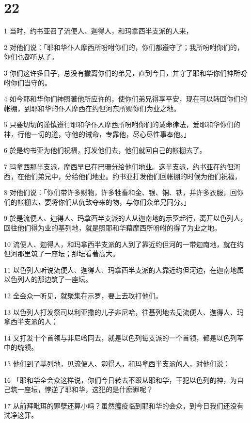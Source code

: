 \chapter{22}

\par 1 当时，约书亚召了流便人、迦得人，和玛拿西半支派的人来，
\par 2 对他们说：「耶和华仆人摩西所吩咐你们的，你们都遵守了；我所吩咐你们的，你们也都听从了。
\par 3 你们这许多日子，总没有撇离你们的弟兄，直到今日，并守了耶和华你们神所吩咐你们当守的。
\par 4 如今耶和华你们神照著他所应许的，使你们弟兄得享平安，现在可以转回你们的帐棚，到耶和华的仆人摩西在约但河东所赐你们为业之地。
\par 5 只要切切的谨慎遵行耶和华仆人摩西所吩咐你们的诫命律法，爱耶和华你们的神，行他一切的道，守他的诫命，专靠他，尽心尽性事奉他。」
\par 6 於是约书亚为他们祝福，打发他们去，他们就回自己的帐棚去了。
\par 7 玛拿西那半支派，摩西早已在巴珊分给他们地业。这半支派，约书亚在约但河西，在他们弟兄中，分给他们地业。约书亚打发他们回帐棚的时候为他们祝福，
\par 8 对他们说：「你们带许多财物，许多牲畜和金、银、铜、铁，并许多衣服，回你们的帐棚去，要将你们从仇敌夺来的物，与你们众弟兄同分。」
\par 9 於是流便人、迦得人、玛拿西半支派的人从迦南地的示罗起行，离开以色列人，回往他们得为业的基列地，就是照耶和华藉摩西所吩咐的得了为业之地。
\par 10 流便人、迦得人，和玛拿西半支派的人到了靠近约但河的一带迦南地，就在约但河那里筑了一座坛；那坛看著高大。
\par 11 以色列人听说流便人、迦得人、玛拿西半支派的人靠近约但河边，在迦南地属以色列人的那边筑了一座坛。
\par 12 全会众一听见，就聚集在示罗，要上去攻打他们。
\par 13 以色列人打发祭司以利亚撒的儿子非尼哈，往基列地去见流便人、迦得人、玛拿西半支派的人；
\par 14 又打发十个首领与非尼哈同去，就是以色列每支派的一个首领，都是以色列军中的统领。
\par 15 他们到了基列地，见流便人、迦得人，和玛拿西半支派的人，对他们说：
\par 16 「耶和华全会众这样说，你们今日转去不跟从耶和华，干犯以色列的神，为自己筑一座坛，悖逆了耶和华，这犯的是什麽罪呢？
\par 17 从前拜毗珥的罪孽还算小吗？虽然瘟疫临到耶和华的会众，到今日我们还没有洗净这罪。
